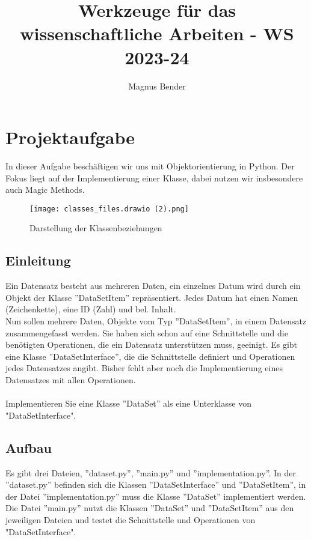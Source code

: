 \documentclass[
 oneside, %
 12pt, %
 a4paper, %
 parskip=full %
]{scrartcl}
\author{Magnus Bender}
\title{Werkzeuge für das wissenschaftliche Arbeiten - WS 2023-24}
\begin{document}
\maketitle

\tableofcontents
{}

\section{Projektaufgabe}
In dieser Aufgabe beschäftigen wir uns mit Objektorientierung in Python. Der Fokus liegt auf der Implementierung einer Klasse, dabei nutzen wir insbesondere auch Magic Methods.

\begin{figure}[h!tbp]
    \centering
    \texttt{[image: classes\_files.drawio (2).png]}
    \caption{Darstellung der Klassenbeziehungen}
\end{figure}

\subsection{Einleitung}
Ein Datensatz besteht aus mehreren Daten, ein einzelnes Datum wird durch ein Objekt der Klasse ''DataSetItem'' repräsentiert.
Jedes Datum hat einen Namen (Zeichenkette), eine ID (Zahl) und bel. Inhalt.\\
Nun sollen mehrere Daten, Objekte vom Typ ''DataSetItem'', in einem Datensatz zusammengefasst werden.
Sie haben sich schon auf eine Schnittstelle und die benötigten Operationen, die ein Datensatz unterstützen muss, geeinigt.
Es gibt eine Klasse ''DataSetInterface'', die die Schnittstelle definiert und Operationen jedes Datensatzes angibt.
Bisher fehlt aber noch die Implementierung eines Datensatzes mit allen Operationen.\\
\\
Implementieren Sie eine Klasse ''DataSet'' als eine Unterklasse von "DataSetInterface".

\subsection{Aufbau}
Es gibt drei Dateien, ''dataset.py'', ''main.py'' und ''implementation.py''.
In der ''dataset.py'' befinden sich die Klassen ''DataSetInterface'' und ''DataSetItem'',
in der Datei ''implementation.py'' muss die Klasse ''DataSet'' implementiert werden.
Die Datei ''main.py'' nutzt die Klassen ''DataSet'' und ''DataSetItem'' aus den jeweiligen Dateien und testet die Schnittstelle und Operationen von "DataSetInterface".\\
\end{document}
